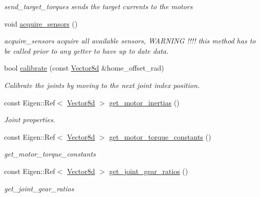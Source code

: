 \begin{DoxyCompactItemize}
\begin{DoxyCompactList}\small\item\em send\+\_\+target\+\_\+torques sends the target currents to the motors \end{DoxyCompactList}\item 
void \hyperlink{classblmc__robots_1_1Solo8_a2ba66edbb1dc4b9fddb9e9978f0fd9e7}{acquire\+\_\+sensors} ()
\begin{DoxyCompactList}\small\item\em acquire\+\_\+sensors acquire all available sensors, W\+A\+R\+N\+I\+NG !!!! this method has to be called prior to any getter to have up to date data. \end{DoxyCompactList}\item 
bool \hyperlink{classblmc__robots_1_1Solo8_adb4de0ff0c5cc2159a1e3b2f32955198}{calibrate} (const \hyperlink{common__header_8hpp_a98975ffbe0bca1296078e0350dfedd60}{Vector8d} \&home\+\_\+offset\+\_\+rad)
\begin{DoxyCompactList}\small\item\em Calibrate the joints by moving to the next joint index position. \end{DoxyCompactList}\item 
const Eigen\+::\+Ref$<$ \hyperlink{common__header_8hpp_a98975ffbe0bca1296078e0350dfedd60}{Vector8d} $>$ \hyperlink{classblmc__robots_1_1Solo8_a61a01cd1309a28be108deb07eb4d2f3b}{get\+\_\+motor\+\_\+inertias} ()
\begin{DoxyCompactList}\small\item\em Joint properties. \end{DoxyCompactList}\item 
const Eigen\+::\+Ref$<$ \hyperlink{common__header_8hpp_a98975ffbe0bca1296078e0350dfedd60}{Vector8d} $>$ \hyperlink{classblmc__robots_1_1Solo8_acdc75776948c56c153ef59ed0bdf8222}{get\+\_\+motor\+\_\+torque\+\_\+constants} ()
\begin{DoxyCompactList}\small\item\em get\+\_\+motor\+\_\+torque\+\_\+constants \end{DoxyCompactList}\item 
const Eigen\+::\+Ref$<$ \hyperlink{common__header_8hpp_a98975ffbe0bca1296078e0350dfedd60}{Vector8d} $>$ \hyperlink{classblmc__robots_1_1Solo8_a1fc849d9d2dfd936fa00147e184b8e5a}{get\+\_\+joint\+\_\+gear\+\_\+ratios} ()
\begin{DoxyCompactList}\small\item\em get\+\_\+joint\+\_\+gear\+\_\+ratios \end{DoxyCompactList}\item 

\end{DoxyCompactItemize}
